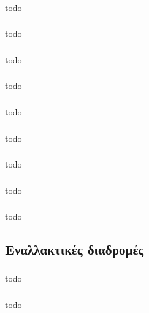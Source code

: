 \documentclass[a4paper, 12pt]{article}
\begin{document}
		\subsubsection{}
			todo

		\subsubsection{}
			todo

		\subsubsection{}
			todo

		\subsubsection{}
			todo

		\subsubsection{}
			todo

		\subsubsection{}
			todo

		\subsubsection{}
			todo

		\subsubsection{}
			todo

		\subsubsection{}
			todo
		
	\subsection{Εναλλακτικές διαδρομές}

		\subsubsection{}
			todo

		\subsubsection{}
			todo
\end{document}
